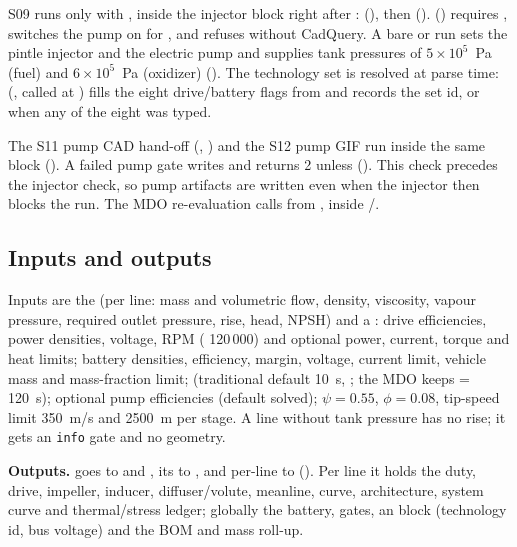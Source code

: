S09 runs only with , inside the injector block right after
:  (),
then 
().  () requires
, switches the pump on for , and
refuses  without CadQuery. A bare or
 run sets the pintle injector and the electric pump and
supplies tank pressures of $5\times10^5$~Pa (fuel) and $6\times10^5$~Pa (oxidizer)
(). The technology set is resolved at parse time:
 (, called at ) fills the
eight drive/battery flags from  and records the set
id, or  when any of the eight was typed.

The S11 pump CAD hand-off (,
) and the S12 pump GIF run inside the
same block (). A failed pump gate writes  and
returns 2 unless  (). This check
precedes the injector check, so pump artifacts are written even when the injector
then blocks the run. The MDO re-evaluation calls  from
, inside /.

\subsection{Inputs and outputs}

Inputs are the  (per line: mass and volumetric flow,
density, viscosity, vapour pressure, required outlet pressure, rise, head, NPSH)
and a : drive efficiencies, power densities, voltage, RPM
( 120\,000) and optional power, current, torque and heat
limits; battery densities, efficiency, margin, voltage, current limit, vehicle
mass and mass-fraction limit;  (traditional default 10~s,
; the MDO keeps  = 120~s); optional pump
efficiencies (default solved); $\psi=0.55$, $\phi=0.08$, tip-speed limit 350~m/s
and 2500~m per stage. A line without tank pressure has no rise; it gets an
\texttt{info} gate and no geometry.

\textbf{Outputs.}  goes to
 and , its  to
, and per-line  to
 (). Per line it holds the
duty, drive, impeller, inducer, diffuser/volute, meanline, curve, architecture,
system curve and thermal/stress ledger; globally the battery, gates, an
 block (technology id, bus voltage) and the BOM and mass roll-up.

